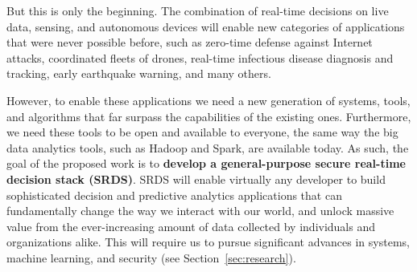 \documentclass [10pt]{article}
\begin{document}
\begin{outline}
But this is only the beginning. The combination of real-time decisions on live data, sensing, and autonomous devices will enable new categories of applications that were never possible before, such as zero-time defense against Internet attacks, coordinated fleets of drones, real-time infectious disease diagnosis and tracking, early earthquake warning, and many others.

However, to enable these applications we need a new generation of systems, tools, and algorithms that far surpass the capabilities of the existing ones.  Furthermore, we need these tools to be open and available to everyone, the same way the big data analytics tools, such as Hadoop and Spark, are available today.  As such, the goal of the proposed work is to {\bf develop a general-purpose secure real-time decision stack (SRDS)}. SRDS will enable virtually any developer to build sophisticated decision and predictive analytics applications that can fundamentally change the way we interact with our world, and unlock massive value from the ever-increasing amount of data collected by individuals and organizations alike. This will require us to pursue significant advances in systems, machine learning, and security (see Section~\ref{sec:research}).






\end{outline}
\end{document}
